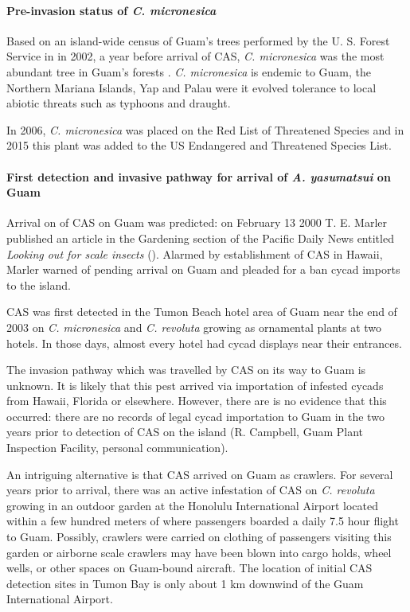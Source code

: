 \documentclass[12pt,letterpaper,english,bibliography=totocnumbered, abstract=on]{scrartcl}
\begin{document}
\paragraph{Pre-invasion status of \textit{C. micronesica}}

Based on an island-wide census of Guam's trees performed by the U. S. Forest Service in in 2002, a year before arrival of CAS, \textit{C. micronesica} was the most abundant tree in Guam's forests \cite{donnegon_guams_2004}. \textit{C. micronesica} is endemic to Guam, the Northern Mariana Islands, Yap and Palau were it evolved tolerance to local abiotic threats such as typhoons and draught. 

In 2006, \textit{C. micronesica} was placed on the Red List of Threatened Species and in 2015 this plant was added to the US Endangered and Threatened Species List.

\paragraph{First detection and invasive pathway for arrival of \textit{A. yasumatsui} on Guam} 

Arrival on of CAS on Guam was predicted: on February 13 2000 T. E. Marler published an article in the Gardening section of the Pacific Daily News entitled \textit{Looking out for scale insects} (\cite{haynesExoticInvasivePest2005}). Alarmed by establishment of CAS in Hawaii, Marler warned of pending arrival on Guam and pleaded for a ban cycad imports to the island. 

CAS was first detected in the Tumon Beach hotel area of Guam near the end of 2003 on \textit{C. micronesica} and \textit{C. revoluta} growing as ornamental plants at two hotels. In those days, almost every hotel had cycad displays near their entrances.

The invasion pathway which was travelled by CAS on its way to Guam is unknown.
It is likely that this pest arrived via importation of infested cycads from Hawaii, Florida or elsewhere. However, there are is no evidence that this occurred: there are no records of legal cycad importation to Guam in the two years prior to detection of CAS on the island (R. Campbell, Guam Plant Inspection Facility, personal communication).  

An intriguing alternative is that CAS arrived on Guam as crawlers. For several years prior to arrival, there was an active infestation of CAS on \textit{C. revoluta} growing in an outdoor garden at the Honolulu International Airport located within a few hundred meters of where passengers boarded a daily 7.5 hour flight to Guam. Possibly, crawlers were carried on clothing of passengers visiting this garden or airborne scale crawlers may have been blown into cargo holds, wheel wells, or other spaces on Guam-bound aircraft. The location of initial CAS detection sites in Tumon Bay is only about 1 km downwind of the Guam International Airport.
\end{document}
